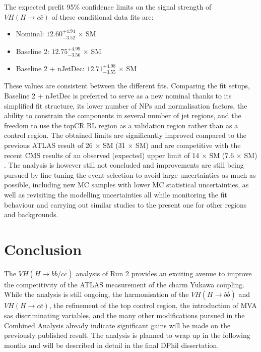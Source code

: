 The expected prefit 95\% confidence limits on the signal strength of $VH(H\rightarrow c\bar{c})$ of these conditional data fits are: 
\begin{itemize}
\item Nominal: $12.60^{+4.94}_{-3.52}$ × SM
\item Baseline 2: $12.75^{+4.99}_{-3.56}$ × SM
\item Baseline 2 + nJetDec: $12.71^{+4.98}_{-3.55}$ × SM
\end{itemize}
These values are consistent between the different fits. Comparing the fit setups, Baseline 2 + nJetDec is preferred to serve as a new nominal thanks to its simplified fit structure, its lower number of NPs and normalisation factors, the ability to constrain the components in several number of jet regions, and the freedom to use the topCR BL region as a validation region rather than as a control region. The obtained limits are significantly improved compared to the previous ATLAS result of 26 × SM (31 × SM) \cite{Collaboration:2721696} and are competitive with the recent CMS results of an observed (expected) upper limit of 14 $\times$ SM (7.6 $\times$ SM) \cite{arXiv:2205.05550}. The analysis is however still not concluded and improvements are still being pursued by fine-tuning the event selection to avoid large uncertainties as much as possible, including new MC samples with lower MC statistical uncertainties, as well as revisiting the modelling uncertainties all while monitoring the fit behaviour and carrying out similar studies to the present one for other regions and backgrounds. 

\section{Conclusion}
The $VH(H\rightarrow b\bar{b}/c\bar{c})$ analysis of Run 2 provides an exciting avenue to improve the competitivity of the ATLAS measurement of the charm Yukawa coupling. While the analysis is still ongoing, the harmonisation of the $VH(H\rightarrow b\bar{b})$ and $VH(H\rightarrow c\bar{c})$, the refinement of the top control region, the introduction of MVA sas discriminating variables, and the many other modifications pursued in the Combined Analysis already indicate significant gains will be made on the previously published result. The analysis is planned to wrap up in the following months and will be described in detail in the final DPhil dissertation. 

\clearpage

